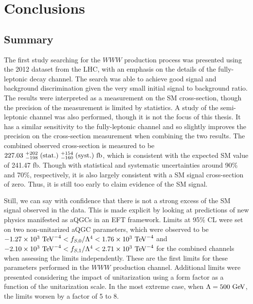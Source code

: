 \chapter{Conclusions}
\label{sec:conclusion}

\section{Summary}
The first study searching for the $WWW$ production process 
was presented using the 2012 dataset from the LHC,
with an emphasis on the details of the fully-leptonic
decay channel. The search was able to achieve good signal
and background discrimination given the very small initial
signal to background ratio. The results were interpreted as a
measurement on the SM cross-section, though the precision
of the measurement is limited by statistics. A study of the
semi-leptonic channel was also performed, though it
is not the focus of this thesis. It has a similar sensitivity
to the fully-leptonic channel and so slightly improves the precision
on the cross-section measurement when combining the two results. The 
combined observed cross-section is measured to be
$227.03 ~ ^{+202}_{-198} \mbox{$\;$(stat.)} ~^{+154}_{-160} \mbox{$\;$(syst.)} ~\textrm{fb}$,
which is consistent with the expected SM value of 241.47 fb.
Though with statistical and systematic uncertainties around
90\% and 70\%, respectively, it is also largely consistent
with a SM signal cross-section of zero. Thus, it is still too early
to claim evidence of the SM signal.

Still, we can say with confidence that there is not a strong excess of the
SM signal observed in the data. This is made explicit by looking 
at predictions of new physics manifested as aQGCs
in an EFT framework. Limits at 95\% CL were set on two non-unitarized aQGC parameters,
which were observed 
to be 
$-1.27 \times 10^3 \TeV^{-4} < f_{S,0}/\Lambda^4 < 1.76 \times 10^3 \TeV^{-4}$
and
$-2.10 \times 10^3 \TeV^{-4} < f_{S,1}/\Lambda^4 < 2.71 \times 10^3 \TeV^{-4}$
for the combined channels when assessing the limits independently.
These are the first limits for these parameters performed in the 
$WWW$ production channel. Additional limits were presented
considering the impact of unitarization using a form factor as a function
of the unitarization scale.
In the most extreme case, when $\Lambda = 500 \GeV$, the limits
worsen by a factor of 5 to 8. 


